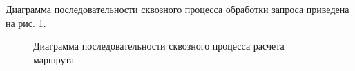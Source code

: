 Диаграмма последовательности сквозного процесса обработки запроса приведена на рис. \ref{fig:routing_sequence}.

\begin{figure}[htbp]
    \centering
    
    \caption{Диаграмма последовательности сквозного процесса расчета маршрута}
    \label{fig:routing_sequence}
\end{figure}
